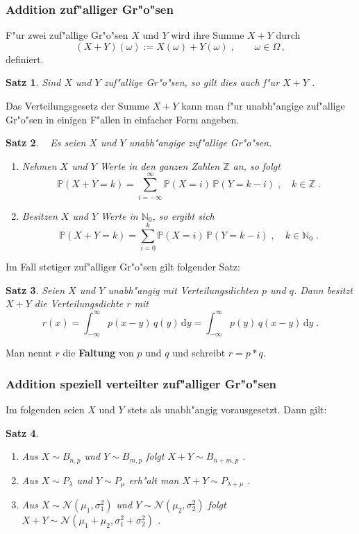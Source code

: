\documentclass[ngerman,draft,parskip=half,twoside]{scrartcl}
\newtheorem{thm}{Satz}[section]
\newcommand*{\N}{\mathbb{N}}      %
\newcommand*{\Z}{\mathbb{Z}}      %
\newcommand*{\WKM}{\mathbb{P}}      %
\begin{document}
\subsubsection{Addition zuf"alliger Gr"o"sen}
F"ur zwei zuf"allige Gr"o"sen $X$  und $Y$ wird ihre Summe $X+Y$ durch
$$
(X+Y)(\omega):=X(\omega)+Y(\omega)\;,\qquad \omega\in\Omega\,,
$$
definiert.
\begin{thm}
Sind $X$ und $Y$ zuf"allige Gr"o"sen, so gilt dies auch f"ur $X+Y$ .
\end{thm}
Das Verteilungsgesetz der Summe $X+Y$ kann man f"ur unabh"angige zuf"allige Gr"o"sen in einigen
F"allen in einfacher Form angeben.
\begin{thm}~
Es seien $X$ und $Y$ unabh"angige zuf"allige Gr"o"sen.
\begin{enumerate}
\item
Nehmen $X$ und $Y$ Werte in den ganzen Zahlen $\Z$ an, so folgt
$$
\WKM(X+Y=k)=\sum_{i=-\infty}^\infty\WKM(X=i)\,\WKM(Y=k-i)\;,\quad k\in \Z\;.
$$
\item
Besitzen $X$ und $Y$ Werte in $\N_0$, so ergibt sich
$$
\WKM(X+Y=k)=\sum_{i=0}^k\WKM(X=i)\,\WKM(Y=k-i)\;,\quad k\in \N_0\;.
$$
\end{enumerate}
\end{thm}
Im Fall stetiger zuf"alliger Gr"o"sen gilt folgender Satz$\colon$
\begin{thm}
Seien $X$ und $Y$ unabh"angig mit Verteilungsdichten $p$ und $q$. Dann besitzt $X+Y$
die Verteilungsdichte $r$  mit
$$
r(x)=\int_{-\infty}^\infty p(x-y)\,q(y)\,\mathrm d y = \int_{-\infty}^\infty p(y)\,q(x-y)\,\mathrm d y \;.
$$
\end{thm}
Man nennt $r$ die \textbf{Faltung} von $p$ und $q$ und schreibt $r=p*q$.
\subsubsection{Addition speziell verteilter zuf"alliger Gr"o"sen}
Im folgenden seien $X$ und $Y$ stets als unabh"angig vorausgesetzt. Dann gilt$\colon$
\begin{thm}~
\begin{enumerate}
\item[\rm (a)]
Aus $X\sim B_{n,p}$ und $Y\sim B_{m,p}$ folgt $X+Y\sim B_{n+m,p}$  .
\item[\rm (b)]
Aus $X\sim P_\lambda$ und $Y\sim P_\mu$ erh"alt man $X+Y\sim P_{\lambda+\mu}$ .
\item[\rm (c)]
Aus $X\sim\mathcal N(\mu_1,\sigma_1^2)$ und $Y\sim\mathcal N(\mu_2,\sigma_2^2)$ folgt
$X+Y\sim \mathcal N(\mu_1+\mu_2,\sigma_1^2+\sigma_2^2)$ .
\end{enumerate}
\end{thm}
\end{document}
